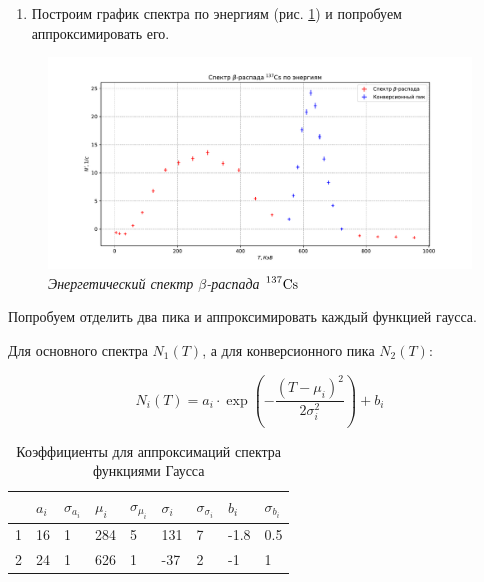 \documentclass[a4paper,12pt]{article}
\begin{document}
\begin{enumerate}[resume]
    \item Построим график спектра по энергиям (рис. \ref{plot:T_N}) и попробуем аппроксимировать его.
\end{enumerate}

\FloatBarrier
\begin{figure}[!ht]
	\includegraphics[width=1.1\textwidth]{plots/T_N.pdf}
	\caption{\textit{Энергетический спектр $\beta$-распада $\prescript{137}{}{\text{Cs}}$}}
	\label{plot:T_N}
\end{figure}
\FloatBarrier

\newpage

Попробуем отделить два пика и аппроксимировать каждый функцией гаусса.

Для основного спектра $N_1(T)$, а для конверсионного пика $N_2(T)$:

\begin{equation*}
    N_i(T) = a_i \cdot \exp{\left( - \frac{(T - \mu_i)^2}{2 \sigma_i^2} \right)} + b_i
\end{equation*}

\begin{table}[!ht]
    \centering
    \begin{tabular}{|l|l|l|l|l|l|l|l|l|}
    \hline
      & $a_i$  & $\sigma_{a_i}$ & $\mu_i$  & $\sigma_{\mu_i}$ & $\sigma_i$ & $\sigma_{\sigma_i}$ & $b_i$    & $\sigma_{b_i}$ \\ \hline
    1 & 16 & 1        & 284 & 5         & 131   & 7            & -1.8 & 0.5      \\ \hline
    2 & 24 & 1        & 626 & 1         & -37   & 2            & -1   & 1        \\ \hline
    \end{tabular}
    \caption{Коэффициенты для аппроксимаций спектра функциями Гаусса}
    \label{table:gauss_coefs}
\end{table}
\end{document}
